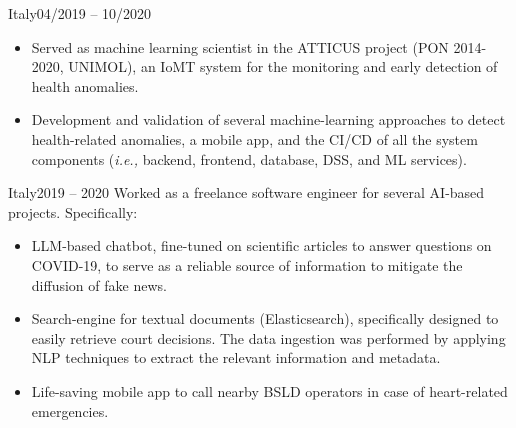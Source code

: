 	\medskip
	
	{Italy}{04/2019 – 10/2020}
	\begin{itemize}
		\item Served as machine learning scientist in the ATTICUS project (PON 2014-2020, UNIMOL), an IoMT system for the monitoring and early detection of health anomalies.
		\item Development and validation of several machine-learning approaches to detect health-related anomalies, a mobile app, and the CI/CD of all the system components (\emph{i.e.,} backend, frontend, database, DSS, and ML services).
	\end{itemize}

	\medskip

	{Italy}{2019 – 2020}
	Worked as a freelance software engineer for several AI-based projects. Specifically:

	\begin{itemize}

		\item LLM-based chatbot, fine-tuned on scientific articles to answer questions on COVID-19, to serve as a reliable source of information to mitigate the diffusion of fake news.
		
		\item Search-engine for textual documents (Elasticsearch), specifically designed to easily retrieve court decisions. The data ingestion was performed by applying NLP techniques to extract the relevant information and metadata.
		
		\item Life-saving mobile app to call nearby BSLD operators in case of heart-related emergencies.
		
	\end{itemize}
